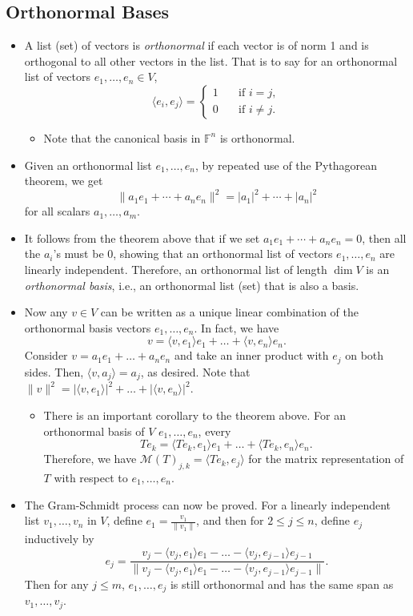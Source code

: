 \documentclass{article}
\newcommand{\F}{\mathbb{F}}
\renewcommand{\d}{\dim}
\newcommand{\inp}[2]{\langle #1, #2 \rangle}
\newcommand{\nm}[1]{\| #1 \|}
\newcommand{\M}{\mathcal{M}}
\begin{document}
\subsection{Orthonormal Bases}
\begin{itemize}
    \item A list (set) of vectors is \textit{orthonormal} if each vector is of norm 1 and is orthogonal to all other vectors in the list. That is to say for an orthonormal list of vectors $e_1,\dots,e_n \in V$,
    \begin{equation*}
    \inp{e_i}{e_j} = 
        \left\{
            \begin{array}{rl}
                1 \quad & \text{if } i = j, \\
                0 \quad & \text{if } i \not= j.
            \end{array}
        \right.
    \end{equation*}
    \begin{itemize}
        \item Note that the canonical basis in $\F^n$ is orthonormal.
    \end{itemize}
    \item Given an orthonormal list $e_1,\dots,e_n$, by repeated use of the Pythagorean theorem, we get $$\nm{a_1 e_1 + \cdots + a_n e_n}^2 = |a_1|^2 + \cdots + |a_n|^2$$ for all scalars $a_1, \dots, a_m$.
    \item It follows from the theorem above that if we set $a_1 e_1 + \cdots + a_n e_n = 0$, then all the $a_i$'s must be 0, showing that an orthonormal list of vectors $e_1,\dots,e_n$ are linearly independent. Therefore, an orthonormal list of length $\d V$ is an \textit{orthonormal basis}, i.e., an orthonormal list (set) that is also a basis.
    \item Now any $v \in V$ can be written as a unique linear combination of the orthonormal basis vectors $e_1,\dots,e_n$. In fact, we have $$v = \inp{v}{e_1}e_1 + \dots + \inp{v}{e_n}e_n.$$
    Consider $v = a_1 e_1 + \dots + a_n e_n$ and take an inner product with $e_j$ on both sides. Then, $\inp{v}{a_j} = a_j$, as desired. Note that $\nm{v}^2 = |\inp{v}{e_1}|^2 + \dots + |\inp{v}{e_n}|^2$.
    \begin{itemize}
        \item There is an important corollary to the theorem above. For an orthonormal basis of $V$ $e_1,\dots,e_n$, every $$Te_k = \inp{Te_k}{e_1}e_1 + \dots + \inp{Te_k}{e_n}e_n.$$ Therefore, we have $\M(T)_{j,k} = \inp{Te_k}{e_j}$ for the matrix representation of $T$ with respect to $e_1,\dots,e_n$.
    \end{itemize}
    \item The Gram-Schmidt process can now be proved. For a linearly independent list $v_1,\dots,v_n$ in $V$, define $e_1 = \frac{v_1}{\nm{v_1}}$, and then for $2 \leq j \leq n$, define $e_j$ inductively by $$e_j = \frac{v_j - \inp{v_j}{e_1}e_1 - \dots - \inp{v_j}{e_{j-1}}e_{j-1}}{\nm{v_j - \inp{v_j}{e_1}e_1 - \dots - \inp{v_j}{e_{j-1}}e_{j-1}}}.$$ Then for any $j \leq m$, $e_1, \dots, e_j$ is still orthonormal and has the same span as $v_1,\dots,v_j$. 
    

\end{itemize}
\end{document}
